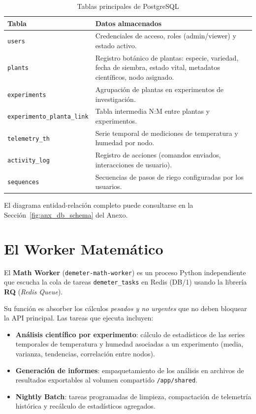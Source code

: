 \begin{table}[H]
    \centering
    \caption{Tablas principales de PostgreSQL}
    \begin{tabular}{lp{10cm}}
        \toprule
        \textbf{Tabla}            & \textbf{Datos almacenados} \\
        \midrule
        \texttt{users}            & Credenciales de acceso, roles (admin/viewer) y estado activo. \\
        \texttt{plants}           & Registro botánico de plantas: especie, variedad, fecha de siembra, estado vital, metadatos científicos, nodo asignado. \\
        \texttt{experiments}      & Agrupación de plantas en experimentos de investigación. \\
        \texttt{experimento\_planta\_link} & Tabla intermedia N:M entre plantas y experimentos. \\
        \texttt{telemetry\_th}    & Serie temporal de mediciones de temperatura y humedad por nodo. \\
        \texttt{activity\_log}    & Registro de acciones (comandos enviados, interacciones de usuario). \\
        \texttt{sequences}        & Secuencias de pasos de riego configuradas por los usuarios. \\
        \bottomrule
    \end{tabular}
    \label{tab:postgres_tables}
\end{table}

El diagrama entidad-relación completo puede consultarse en la Sección~\ref{fig:anx_db_schema} del Anexo.


\section{El Worker Matemático}

El \textbf{Math Worker} (\texttt{demeter-math-worker}) es un proceso Python independiente que 
escucha la cola de tareas \texttt{demeter\_tasks} en Redis (DB/1) usando la librería 
\textbf{RQ} (\textit{Redis Queue}).

Su función es absorber los cálculos \textit{pesados y no urgentes} que no deben bloquear la 
API principal. Las tareas que ejecuta incluyen:

\begin{itemize}[leftmargin=*, label=--]
    \item \textbf{Análisis científico por experimento}: cálculo de estadísticos de las series 
          temporales de temperatura y humedad asociadas a un experimento (media, varianza, 
          tendencias, correlación entre nodos).
    \item \textbf{Generación de informes}: empaquetamiento de los análisis en archivos de 
          resultados exportables al volumen compartido \texttt{/app/shared}.
    \item \textbf{Nightly Batch}: tareas programadas de limpieza, compactación de telemetría 
          histórica y recálculo de estadísticos agregados.
\end{itemize}

